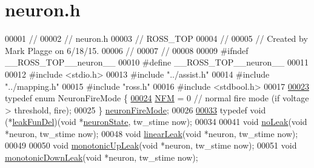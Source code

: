 \hypertarget{neuron_8h_source}{}\section{neuron.\+h}
\label{neuron_8h_source}

\begin{DoxyCode}
00001 \textcolor{comment}{//}
00002 \textcolor{comment}{//  neuron.h}
00003 \textcolor{comment}{//  ROSS\_TOP}
00004 \textcolor{comment}{//}
00005 \textcolor{comment}{//  Created by Mark Plagge on 6/18/15.}
00006 \textcolor{comment}{//}
00007 \textcolor{comment}{//}
00008 
00009 \textcolor{preprocessor}{#ifndef \_\_ROSS\_TOP\_\_neuron\_\_}
00010 \textcolor{preprocessor}{#define \_\_ROSS\_TOP\_\_neuron\_\_}
00011 
00012 \textcolor{preprocessor}{#include <stdio.h>}
00013 \textcolor{preprocessor}{#include "../assist.h"}
00014 \textcolor{preprocessor}{#include "../mapping.h"}
00015 \textcolor{preprocessor}{#include "ross.h"}
00016 \textcolor{preprocessor}{#include <stdbool.h>}
00017 
\hypertarget{neuron_8h_source_l00023}{}\hyperlink{neuron_8h_a48885ea6be5b55a2e24de9f97552d4ee}{00023}     \textcolor{keyword}{typedef} \textcolor{keyword}{enum} NeuronFireMode \{
\hypertarget{neuron_8h_source_l00024}{}\hyperlink{neuron_8h_a48885ea6be5b55a2e24de9f97552d4eea520c6b216334b8c2d914cf9fab8cd460}{00024}   \hyperlink{neuron_8h_a48885ea6be5b55a2e24de9f97552d4eea520c6b216334b8c2d914cf9fab8cd460}{NFM} = 0  \textcolor{comment}{// normal fire mode (if voltage > threshold, fire);}
00025     \} \hyperlink{neuron_8h_a48885ea6be5b55a2e24de9f97552d4ee}{neuronFireMode};
00026 
\hypertarget{neuron_8h_source_l00033}{}\hyperlink{neuron_8h_a7362d32c8d9b6dc323f5d1b05af9855b}{00033} \textcolor{keyword}{typedef} void (*\hyperlink{structleak_fun_del}{leakFunDel})(\textcolor{keywordtype}{void} *\hyperlink{structneuron_state}{neuronState}, tw\_stime now);
00034 
00041 \textcolor{keywordtype}{void} \hyperlink{neuron_8h_a8e52befc10f975c6be39cc93af573d7e}{noLeak}(\textcolor{keywordtype}{void} *neuron, tw\_stime now);
00048 \textcolor{keywordtype}{void} \hyperlink{neuron_8h_a64dc379b459a2b07b40bce35381210e8}{linearLeak}(\textcolor{keywordtype}{void} *neuron, tw\_stime now);
00049 
00050 \textcolor{keywordtype}{void} \hyperlink{neuron_8h_a5a4f7abf694fe6ff2aa68ebd5584bc4b}{monotonicUpLeak}(\textcolor{keywordtype}{void} *neuron, tw\_stime now);
00051 \textcolor{keywordtype}{void} \hyperlink{neuron_8h_a8c023bc2fc6d628a105b460226b106f9}{monotonicDownLeak}(\textcolor{keywordtype}{void} *neuron, tw\_stime now);

\end{DoxyCode}
